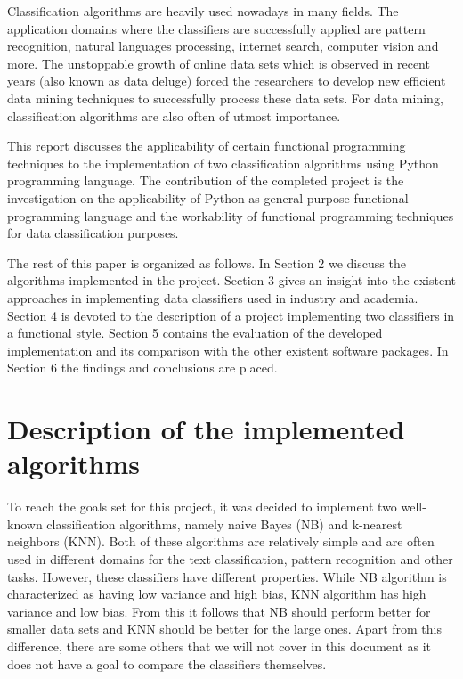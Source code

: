 \documentclass{llncs}
\begin{document}
Classification algorithms are heavily used nowadays in many fields. The application domains where the classifiers are successfully applied are pattern recognition, natural languages processing, internet search, computer vision and more. The unstoppable growth of online data sets which is observed in recent years (also known as data deluge) forced the researchers to develop new efficient data mining techniques to successfully process these data sets. For data mining, classification algorithms are also often of utmost importance.

This report discusses the applicability of certain functional programming techniques to the implementation of two classification algorithms using Python programming language. The contribution of the completed project is the investigation on the applicability of Python as general-purpose functional programming language and the workability of functional programming techniques for data classification purposes.

The rest of this paper is organized as follows. In Section 2 we discuss the algorithms implemented in the project. Section 3 gives an insight into the existent approaches in implementing data classifiers used in industry and academia. Section 4 is devoted to the description of a project implementing two classifiers in a functional style. Section 5 contains the evaluation of the developed implementation and its comparison with the other existent software packages. In Section 6 the findings and conclusions are placed.

\section{Description of the implemented algorithms}

To reach the goals set for this project, it was decided to implement two well-known classification algorithms, namely naive Bayes (NB) and k-nearest neighbors (KNN). Both of these algorithms are relatively simple and are often used in different domains for the text classification, pattern recognition and other tasks. However, these classifiers have different properties. While NB algorithm is characterized as having low variance and high bias, KNN algorithm has high variance and low bias. From this it follows that NB should perform better for smaller data sets and KNN should be better for the large ones. Apart from this difference, there are some others that we will not cover in this document as it does not have a goal to compare the classifiers themselves. 
\end{document}
